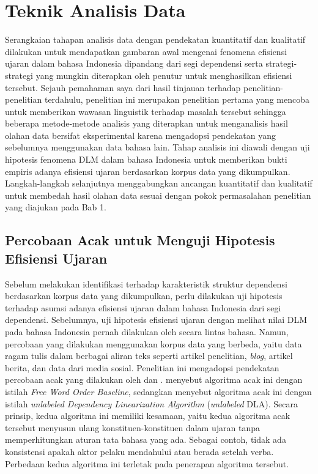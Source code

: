 \section{Teknik Analisis Data}

Serangkaian tahapan analisis data dengan pendekatan kuantitatif dan kualitatif dilakukan untuk mendapatkan gambaran awal mengenai fenomena efisiensi ujaran dalam bahasa Indonesia dipandang dari segi dependensi serta strategi-strategi yang mungkin diterapkan oleh penutur untuk menghasilkan efisiensi tersebut. Sejauh pemahaman saya dari hasil tinjauan terhadap penelitian-penelitian terdahulu, penelitian ini merupakan penelitian pertama yang mencoba untuk memberikan wawasan linguistik terhadap masalah tersebut sehingga beberapa metode-metode analisis yang diterapkan untuk menganalisis hasil olahan data bersifat eksperimental karena mengadopsi pendekatan yang sebelumnya menggunakan data bahasa lain. Tahap analisis ini diawali dengan uji hipotesis fenomena DLM dalam bahasa Indonesia untuk memberikan bukti empiris adanya efisiensi ujaran berdasarkan korpus data yang dikumpulkan. Langkah-langkah selanjutnya menggabungkan ancangan kuantitatif dan kualitatif untuk membedah hasil olahan data sesuai dengan pokok permasalahan penelitian yang diajukan pada Bab 1.

\subsection{Percobaan Acak untuk Menguji Hipotesis Efisiensi Ujaran}
Sebelum melakukan identifikasi terhadap karakteristik struktur dependensi berdasarkan korpus data yang dikumpulkan, perlu dilakukan uji hipotesis terhadap asumsi adanya efisiensi ujaran dalam bahasa Indonesia dari segi dependensi. Sebelumnya, uji hipotesis efisiensi ujaran dengan melihat nilai DLM pada bahasa Indonesia pernah dilakukan oleh \cite{futrell2015large} secara lintas bahasa. Namun, percobaan yang dilakukan \cite{futrell2015large} menggunakan korpus data yang berbeda, yaitu data ragam tulis dalam berbagai aliran teks seperti artikel penelitian, \textit{blog}, artikel berita, dan data dari media sosial. Penelitian ini mengadopsi pendekatan percobaan acak yang dilakukan oleh \cite{futrell2015large} dan \cite{gildea2010grammars}. \cite{futrell2015large} menyebut algoritma acak ini dengan istilah \textit{Free Word Order Baseline}, sedangkan \cite{gildea2010grammars} menyebut algoritma acak ini dengan istilah \textit{unlabeled Dependency Linearization Algorithm} (\textit{unlabeled} DLA). Secara prinsip, kedua algoritma ini memiliki kesamaan, yaitu kedua algoritma acak tersebut menyusun ulang konstituen-konstituen dalam ujaran tanpa memperhitungkan aturan tata bahasa yang ada. Sebagai contoh, tidak ada konsistensi apakah aktor pelaku mendahului atau berada setelah verba. Perbedaan kedua algoritma ini terletak pada penerapan algoritma tersebut. 

